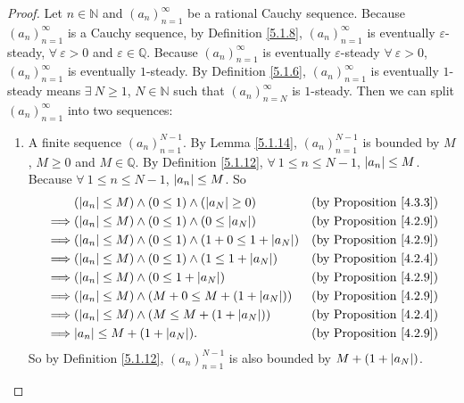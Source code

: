 \begin{proof}
Let \(n \in \mathds{N}\) and \((a_n)_{n = 1}^{\infty}\) be a rational Cauchy sequence.
Because \((a_n)_{n = 1}^{\infty}\) is a Cauchy sequence, by Definition \ref{5.1.8}, \((a_n)_{n = 1}^{\infty}\) is eventually \(\varepsilon\)-steady, \(\forall\ \varepsilon > 0\) and \(\varepsilon \in \mathds{Q}\).
Because \((a_n)_{n = 1}^{\infty}\) is eventually \(\varepsilon\)-steady \(\forall\ \varepsilon > 0\), \((a_n)_{n = 1}^{\infty}\) is eventually \(1\)-steady.
By Definition \ref{5.1.6}, \((a_n)_{n = 1}^{\infty}\) is eventually \(1\)-steady means \(\exists\ N \geq 1\), \(N \in \mathds{N}\) such that \((a_n)_{n = N}^{\infty}\) is \(1\)-steady.
Then we can split \((a_n)_{n = 1}^{\infty}\) into two sequences:
\begin{enumerate}
    \item A finite sequence \((a_n)_{n = 1}^{N - 1}\).
    By Lemma \ref{5.1.14}, \((a_n)_{n = 1}^{N - 1}\) is bounded by \(M\), \(M \geq 0\) and \(M \in \mathds{Q}\).
    By Definition \ref{5.1.12}, \(\forall\ 1 \leq n \leq N - 1\), \(\abs*{a_n} \leq M\).
    Because \(\forall\ 1 \leq n \leq N - 1\), \(\abs*{a_n} \leq M\).
    So
    \begin{align*}
    & (\abs*{a_n} \leq M) \land (0 \leq 1) \land (\abs*{a_N} \geq 0) & \text{(by Proposition \ref{4.3.3})} \\
    \implies & (\abs*{a_n} \leq M) \land (0 \leq 1) \land (0 \leq \abs*{a_N}) & \text{(by Proposition \ref{4.2.9})} \\
    \implies & (\abs*{a_n} \leq M) \land (0 \leq 1) \land (1 + 0 \leq 1 + \abs*{a_N}) & \text{(by Proposition \ref{4.2.9})} \\
    \implies & (\abs*{a_n} \leq M) \land (0 \leq 1) \land (1 \leq 1 + \abs*{a_N}) & \text{(by Proposition \ref{4.2.4})} \\
    \implies & (\abs*{a_n} \leq M) \land (0 \leq 1 + \abs*{a_N}) & \text{(by Proposition \ref{4.2.9})} \\
    \implies & (\abs*{a_n} \leq M) \land (M + 0 \leq M + (1 + \abs*{a_N})) & \text{(by Proposition \ref{4.2.9})} \\
    \implies & (\abs*{a_n} \leq M) \land (M \leq M + (1 + \abs*{a_N})) & \text{(by Proposition \ref{4.2.4})} \\
    \implies & \abs*{a_n} \leq  M + (1 + \abs*{a_N}). & \text{(by Proposition \ref{4.2.9})}
    \end{align*}
    So by Definition \ref{5.1.12}, \((a_n)_{n = 1}^{N - 1}\) is also bounded by \(M + (1 + \abs*{a_N})\).

\end{enumerate}
\end{proof}
